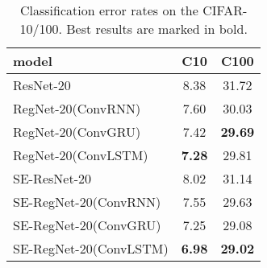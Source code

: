 \documentclass[journal,comsoc]{IEEEtran}
\begin{document}
\begin{table}
\caption{Classification error rates on the CIFAR-10/100. Best results are marked in bold.}
\begin{center}
\begin{tabular}{l|c|c}
\hline
model   & C10 & C100\\
\hline\hline
ResNet-20~\cite{DBLP:journals/corr/HeZRS15} &  8.38 & 31.72  \\
RegNet-20(ConvRNN) &  7.60 & 30.03  \\
RegNet-20(ConvGRU) &  7.42 & \textbf{29.69}  \\
RegNet-20(ConvLSTM) & \textbf{7.28} & 29.81 \\
\hline

SE-ResNet-20 &  8.02 & 31.14  \\
SE-RegNet-20(ConvRNN)& 7.55  &  29.63 \\
SE-RegNet-20(ConvGRU)&  7.25 & 29.08  \\
SE-RegNet-20(ConvLSTM) & \textbf{6.98} & \textbf{29.02} \\

\hline
\end{tabular}
\end{center}
\label{table:cifar_10_classification_error}
\end{table}


\begin{table*}[t]
\caption{Test error rates on CIFAR-10/100. We use ConvGRU and ConvLSTM as regulators of ResNet. We list the increase of parameter the architectures at the right corner of the error rates. }
\begin{center}
\end{center}
\label{table:paramter_analysis}
\end{table*}
\end{document}
